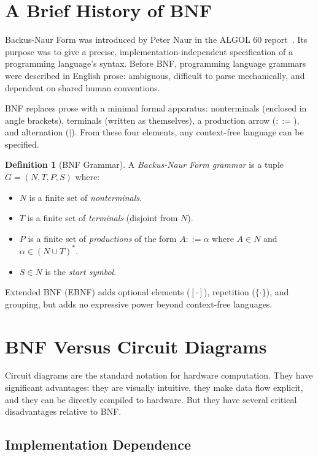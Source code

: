 \documentclass[12pt, a4paper, openany]{book}
\theoremstyle{plain}
\theoremstyle{definition}
\newtheorem{definition}[theorem]{Definition}
\theoremstyle{remark}
\begin{document}
\section{A Brief History of BNF}

Backus-Naur Form was introduced by Peter Naur in the ALGOL 60 report~\cite{naur60}.
Its purpose was to give a precise, implementation-independent specification of a
programming language's syntax. Before BNF, programming language grammars were
described in English prose: ambiguous, difficult to parse mechanically, and
dependent on shared human conventions.

BNF replaces prose with a minimal formal apparatus: nonterminals (enclosed in
angle brackets), terminals (written as themselves), a production arrow ($::=$),
and alternation ($\mid$). From these four elements, any context-free language can
be specified.

\begin{definition}[BNF Grammar]
A \emph{Backus-Naur Form grammar} is a tuple $G = (N, T, P, S)$ where:
\begin{itemize}
\item $N$ is a finite set of \emph{nonterminals}.
\item $T$ is a finite set of \emph{terminals} (disjoint from $N$).
\item $P$ is a finite set of \emph{productions} of the form $A ::= \alpha$
where $A \in N$ and $\alpha \in (N \cup T)^*$.
\item $S \in N$ is the \emph{start symbol}.
\end{itemize}
\end{definition}

Extended BNF (EBNF) adds optional elements ($[\cdot]$), repetition ($\{\cdot\}$),
and grouping, but adds no expressive power beyond context-free languages.

\section{BNF Versus Circuit Diagrams}

Circuit diagrams are the standard notation for hardware computation. They have
significant advantages: they are visually intuitive, they make data flow explicit,
and they can be directly compiled to hardware. But they have several critical
disadvantages relative to BNF.

\subsection{Implementation Dependence}
\end{document}
